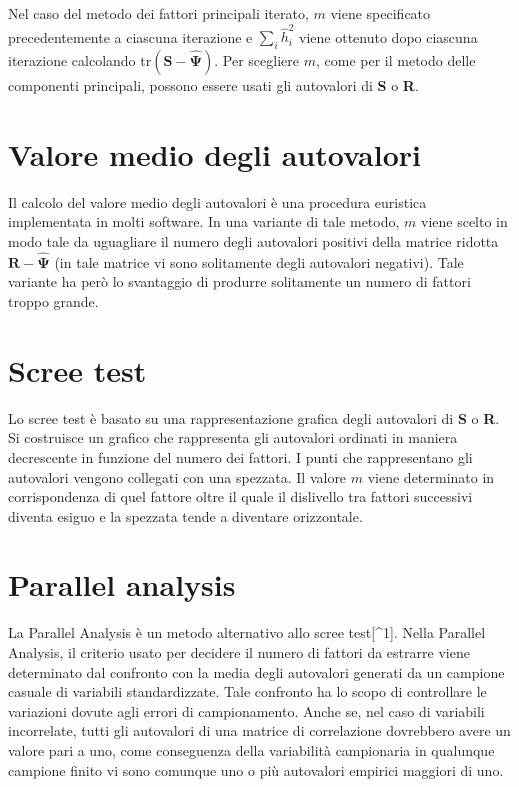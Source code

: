 \documentclass[
  11pt,
]{krantz}
\theoremstyle{definition}
\theoremstyle{definition}
\theoremstyle{definition}
\theoremstyle{definition}
\theoremstyle{remark}
\begin{document}
Nel caso del metodo dei fattori principali iterato, \(m\) viene specificato precedentemente a ciascuna iterazione e \(\sum_{i} \hat{h}^2_i\) viene ottenuto dopo ciascuna iterazione calcolando \(\text{tr}(\textbf{S} - \hat{\boldsymbol{\Psi}})\). Per scegliere \(m\), come per il metodo delle componenti principali, possono essere usati gli autovalori di \textbf{S} o \textbf{R}.

\hypertarget{valore-medio-degli-autovalori}{%
\section{Valore medio degli autovalori}\label{valore-medio-degli-autovalori}}

Il calcolo del valore medio degli autovalori è una procedura euristica implementata in molti software. In una variante di tale metodo, \(m\) viene scelto in modo tale da uguagliare il numero degli autovalori positivi della matrice ridotta \(\textbf{R} - \hat{\boldsymbol{\Psi}}\) (in tale matrice vi sono solitamente degli autovalori negativi). Tale variante ha però lo svantaggio di produrre solitamente un numero di fattori troppo grande.

\hypertarget{scree-test}{%
\section{Scree test}\label{scree-test}}

Lo scree test è basato su una rappresentazione grafica degli autovalori di \textbf{S} o \textbf{R}. Si costruisce un grafico che rappresenta gli autovalori ordinati in maniera decrescente in funzione del numero dei fattori. I punti che rappresentano gli autovalori vengono collegati con una spezzata. Il valore \(m\) viene determinato in corrispondenza di quel fattore oltre il quale il dislivello tra fattori successivi diventa esiguo e la spezzata tende a diventare orizzontale.

\hypertarget{parallel-analysis}{%
\section{Parallel analysis}\label{parallel-analysis}}

La Parallel Analysis è un metodo alternativo allo scree test{[}\^{}1{]}. Nella Parallel Analysis, il criterio usato per decidere il numero di fattori da estrarre viene determinato dal confronto con la media degli autovalori generati da un campione casuale di variabili standardizzate. Tale confronto ha lo scopo di controllare le variazioni dovute agli errori di campionamento. Anche se, nel caso di variabili incorrelate, tutti gli autovalori di una matrice di correlazione dovrebbero avere un valore pari a uno, come conseguenza della variabilità campionaria in qualunque campione finito vi sono comunque uno o più autovalori empirici maggiori di uno.
\end{document}
